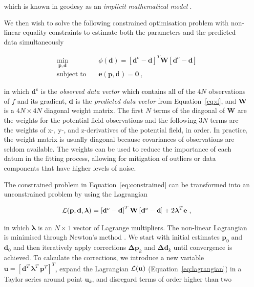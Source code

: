 \noindent
which is known in geodesy as an \textit{implicit mathematical model}
\citep{Vanicek1986}.

We then wish to solve the following constrained optimisation problem with
non-linear equality constraints to estimate both the parameters and the
predicted data simultaneously

\begin{equation}
  \begin{aligned}
    \min_{\mathbf{p}, \mathbf{d}} \quad &
      \phi(\mathbf{d}) =
      \left[\mathbf{d}^o - \mathbf{d}\right]^T \mathbf{W}
      \left[\mathbf{d}^o - \mathbf{d}\right]
    \\
    \textrm{subject to} \quad &
      \mathbf{e}(\mathbf{p}, \mathbf{d}) = \mathbf{0}
    \ ,
  \end{aligned}
  \label{eq:constrained}
\end{equation}

\noindent
in which $\mathbf{d}^o$ is the \textit{observed data vector} which contains all
of the $4N$ observations of $f$ and its gradient,
$\mathbf{d}$ is the \textit{predicted data vector} from Equation~\ref{eq:d},
and $\mathbf{W}$ is a $4N \times 4N$ diagonal weight matrix.
The first $N$ terms of the diagonal of $\mathbf{W}$ are the weights for the
potential field observations and the following $3N$ terms are the weights of
x-, y-, and z-derivatives of the potential field, in order.
In practice, the weight matrix is usually diagonal because covariances of
observations are seldom available.
The weights can be used to reduce the importance of each datum in the
fitting process, allowing for mitigation of outliers or data components that
have higher levels of noise.

The constrained problem in Equation~\ref{eq:constrained} can be transformed
into an unconstrained problem by using the Lagrangian

\begin{equation}
  \operatorname{\mathcal{L}}(\mathbf{p}, \mathbf{d}, \boldsymbol{\lambda}) =
    \left[\mathbf{d}^o - \mathbf{d}\right]^T \mathbf{W}
    \left[\mathbf{d}^o - \mathbf{d}\right]
    +
    2 \boldsymbol{\lambda}^T \mathbf{e}
  \ ,
  \label{eq:lagrangian}
\end{equation}

\noindent
in which $\boldsymbol{\lambda}$ is an $N \times 1$ vector of Lagrange
multipliers.
The non-linear Lagrangian is minimised through Newton's method
\citep{Aster2019}.
We start with initial estimates $\mathbf{p}_0$ and $\mathbf{d}_0$ and then
iteratively apply corrections $\mathbf{\Delta p}_k$ and $\mathbf{\Delta d}_k$
until convergence is achieved.
To calculate the corrections, we introduce a new variable $\mathbf{u} =
[\mathbf{d}^T\  \boldsymbol{\lambda}^T \ \mathbf{p}^T]^T$, expand the
Lagrangian $\operatorname{\mathcal{L}}(\mathbf{u})$ (Equation~\ref{eq:lagrangian}) in a Taylor
series around point $\mathbf{u}_k$, and disregard terms of order higher than
two

